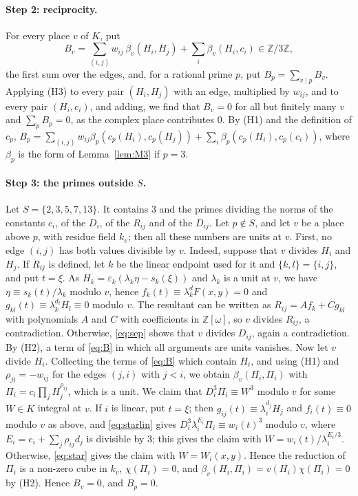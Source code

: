 \documentclass[11pt]{article}
\newcommand{\Z}{\mathbb{Z}}
\begin{document}
\paragraph{Step 2: reciprocity.} For every place $v$ of $K$, put
\begin{equation}\label{eq:B}
B_v=\sum_{(i,j)}w_{ij}\,\beta_v(H_i,H_j)+\sum_i\beta_v(H_i,c_i)\in\Z/3\Z,
\end{equation}
the first sum over the edges, and, for a rational prime $p$, put $B_p=\sum_{v\mid p}B_v$. Applying (H3) to every pair $(H_i,H_j)$ with an edge, multiplied by $w_{ij}$, and to every pair $(H_i,c_i)$, and adding, we find that $B_v=0$ for all but finitely many $v$ and $\sum_pB_p=0$, as the complex place contributes $0$. By (H1) and the definition of $c_p$, $B_p=\sum_{(i,j)}w_{ij}\beta_p(c_p(H_i),c_p(H_j))+\sum_i\beta_p(c_p(H_i),c_p(c_i))$, where $\beta_p$ is the form of Lemma~\ref{lem:M3} if $p=3$.

\paragraph{Step 3: the primes outside $S$.} Let $S=\{2,3,5,7,13\}$. It contains $3$ and the primes dividing the norms of the constants $c_i$, of the $D_i$, of the $R_{ij}$ and of the $D_{ij}$. Let $p\notin S$, and let $v$ be a place above $p$, with residue field $k_v$; then all these numbers are units at $v$. First, no edge $(i,j)$ has both values divisible by $v$. Indeed, suppose that $v$ divides $H_i$ and $H_j$. If $R_{ij}$ is defined, let $k$ be the linear endpoint used for it and $\{k,l\}=\{i,j\}$, and put $t=\xi$. As $H_k=\varepsilon_k(\lambda_k\eta-s_k(\xi))$ and $\lambda_k$ is a unit at $v$, we have $\eta\equiv s_k(t)/\lambda_k$ modulo $v$, hence $f_k(t)\equiv\lambda_k^dF(x,y)=0$ and $g_{kl}(t)\equiv\lambda_k^{d_l}H_l\equiv0$ modulo $v$. The resultant can be written as $R_{ij}=Af_k+Cg_{kl}$ with polynomials $A$ and $C$ with coefficients in $\Z[\omega]$, so $v$ divides $R_{ij}$, a contradiction. Otherwise, \eqref{eq:sep} shows that $v$ divides $D_{ij}$, again a contradiction. By (H2), a term of \eqref{eq:B} in which all arguments are units vanishes. Now let $v$ divide $H_i$. Collecting the terms of \eqref{eq:B} which contain $H_i$, and using (H1) and $\rho_{ji}=-w_{ij}$ for the edges $(j,i)$ with $j<i$, we obtain $\beta_v(H_i,\Pi_i)$ with $\Pi_i=c_i\prod_jH_j^{\rho_{ij}}$, which is a unit. We claim that $D_i^3\Pi_i\equiv W^3$ modulo $v$ for some $W\in K$ integral at $v$. If $i$ is linear, put $t=\xi$; then $g_{ij}(t)\equiv\lambda_i^{d_j}H_j$ and $f_i(t)\equiv0$ modulo $v$ as above, and \eqref{eq:starlin} gives $D_i^3\lambda_i^{E_i}\Pi_i\equiv w_i(t)^3$ modulo $v$, where $E_i=e_i+\sum_j\rho_{ij}d_j$ is divisible by $3$; this gives the claim with $W=w_i(t)/\lambda_i^{E_i/3}$. Otherwise, \eqref{eq:star} gives the claim with $W=W_i(x,y)$. Hence the reduction of $\Pi_i$ is a non-zero cube in $k_v$, $\chi(\Pi_i)=0$, and $\beta_v(H_i,\Pi_i)=v(H_i)\chi(\Pi_i)=0$ by (H2). Hence $B_v=0$, and $B_p=0$.
\end{document}

